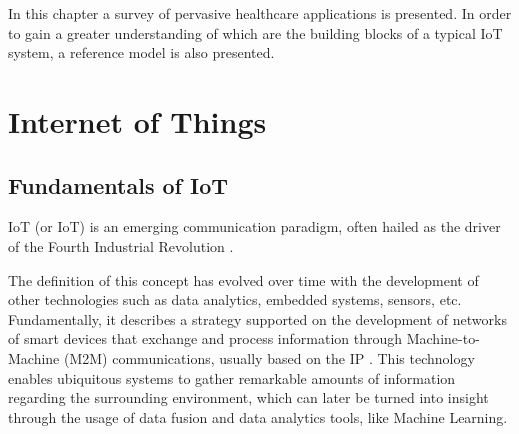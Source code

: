 In this chapter a survey of pervasive healthcare applications is presented. In order to gain a greater understanding of which are the building blocks of a typical \acf{IoT} system, a reference model is also presented.



\section{Internet of Things}

\subsection{Fundamentals of \acs{IoT}}


\acl{IoT} (or \acs{IoT}) is an emerging communication paradigm, often hailed as the driver of the Fourth Industrial Revolution \cite{Aceto2020}. \bigskip


The definition of this concept has evolved over time with the development of other technologies such as data analytics, embedded systems, sensors, etc. Fundamentally, it describes a strategy supported on the development of networks of smart devices that exchange and process information through Machine-to-Machine (M2M) communications, usually based on the \acf{IP} \cite{Baker2017}. This technology enables ubiquitous systems to gather remarkable amounts of information regarding the surrounding environment, which can later be turned into insight through the usage of data fusion and data analytics tools, like Machine Learning. \bigskip

